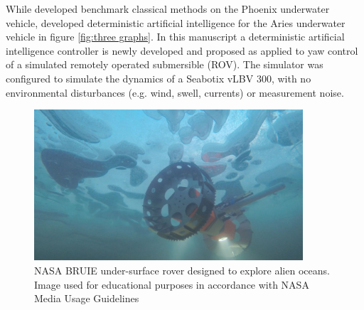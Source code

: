 \documentclass[applsci,article,submit,pdftex,moreauthors]{Definitions/mdpi}
\begin{document}
While \cite{Sands18} developed benchmark classical methods on the Phoenix underwater vehicle, \cite{Sands20} developed deterministic artificial intelligence for the Aries underwater vehicle in figure \ref{fig:three graphs}. In this manuscript a deterministic artificial intelligence controller is newly developed and proposed as applied to yaw control of a simulated remotely operated submersible (ROV). The simulator was configured to simulate the dynamics of a Seabotix vLBV 300, with no environmental disturbances (e.g. wind, swell, currents) or measurement noise.

\begin{figure}[h]
  \widefigure
\includegraphics[width=10cm]{NASAbruie20191118.jpg}
\caption{NASA BRUIE under-surface rover designed to explore alien oceans.\cite{NASA19} Image used for educational purposes in accordance with NASA Media Usage Guidelines \cite{NASA22}}
\label{fig:NASAbruie20191118}
\end{figure}
\end{document}
